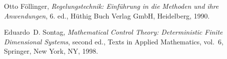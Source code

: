 \begin{thebibliography}{Son98}

Otto Föllinger, \emph{Regelungstechnik: Einführung in die Methoden und ihre
  Anwendungen}, 6. ed., Hüthig Buch Verlag GmbH, Heidelberg, 1990.

Eduardo~D. Sontag, \emph{Mathematical Control Theory: Deterministic Finite
  Dimensional Systems}, second ed., Texts in Applied Mathematics, vol.~6,
  Springer, New York, NY, 1998.

\end{thebibliography}